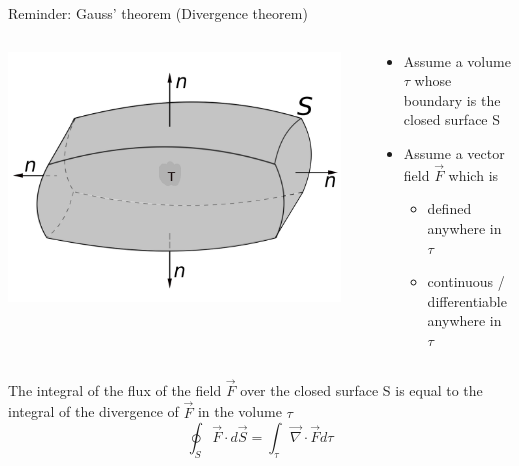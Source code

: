 {\begin{frame}{Reminder: Gauss' theorem (Divergence theorem)}
\begin{columns}
  \begin{column}{0.35\textwidth}
   \begin{center}
     \includegraphics[width=0.95\textwidth]{./images/schematics/divergence_theorem_tau.png}\\
   \end{center}
  \end{column}
  \begin{column}{0.65\textwidth}
     \begin{itemize}
       \item Assume a volume $\tau$ whose boundary is the closed surface S
       \item Assume a vector field $\vec{F}$ which is
        \begin{itemize}
           \item defined anywhere in $\tau$
           \item continuous / differentiable anywhere in $\tau$
        \end{itemize}
     \end{itemize}
  \end{column}
\end{columns}

 The integral of the flux of the field $\vec{F}$ over the closed surface S is
 equal to the integral of the divergence of $\vec{F}$ in the volume $\tau$\\
 \begin{equation*}
   \oint_{S} \vec{F} \cdot d\vec{S} = \int_{\tau} \vec{\nabla} \cdot \vec{F} d\tau
 \end{equation*}

\end{frame}

} %



